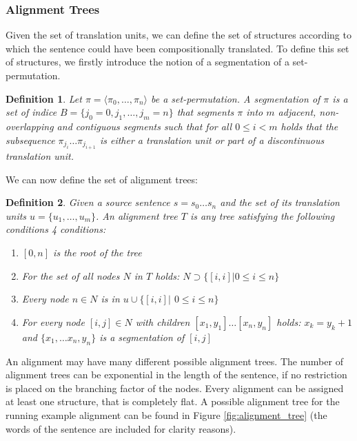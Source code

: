 \documentclass{report}
\theoremstyle{definition}
\theoremstyle{plain}
\newtheorem{definition}{Definition}
\begin{document}
\subsubsection{Alignment Trees} Given the set of translation units, we can define the set of structures according to which the sentence could have been compositionally translated. To define this set of structures, we firstly introduce the notion of a segmentation of a set-permutation.

\begin{definition}
Let $\pi = \langle \pi_0, \ldots,\pi_n\rangle$ be a set-permutation. A segmentation of $\pi$ is a set of indice $B = \{j_0 = 0, j_1, \ldots ,j_m = n\}$ that segments $\pi$ into $m$ adjacent, non-overlapping and contiguous segments such that for all $0\leq i < m$ holds that the subsequence $\pi_{j_i}\ldots\pi_{j_{i+1}}$ is either a translation unit or part of a discontinuous translation unit.%
\end{definition}

We can now define the set of alignment trees:

\begin{definition}
Given a source sentence $s = s_0 \ldots s_n$ and the set of its translation units $u = \{u_1,\ldots,u_m\}$. An alignment tree $T$ is any tree satisfying the following conditions 4 conditions:\begin{enumerate}
\item $[0,n]$ is the root of the tree
\item For the set of all nodes $N$ in $T$ holds: $N\supset \{[i,i]| 0\leq i\leq n\}$
\item Every node $n\in N$ is in $u\cup \{[i,i]|$ $0\leq i\leq n\} $
\item For every node $[i,j] \in N$ with children $[x_1,y_1]\ldots [x_n,y_n]$ holds: $x_k = y_k+1$ and $\{x_1,\ldots x_n, y_n\}$ is a segmentation of $[i,j]$ %
\end{enumerate}
\end{definition}

An alignment may have many different possible alignment trees. The number of alignment trees can be exponential in the length of the sentence, if no restriction is placed on the branching factor of the nodes. Every alignment can be assigned at least one structure, that is completely flat. A possible alignment tree for the running example alignment can be found in Figure \ref{fig:alignment_tree} (the words of the sentence are included for clarity reasons).
\end{document}
